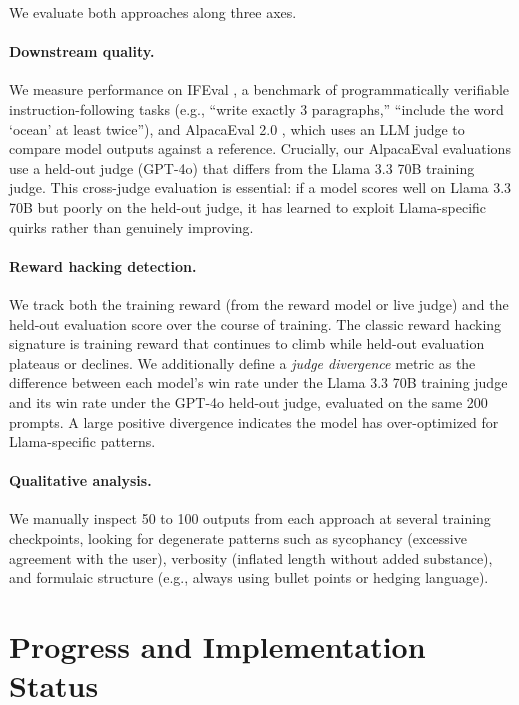 \documentclass{article}
\begin{document}
We evaluate both approaches along three axes.

\paragraph{Downstream quality.} We measure performance on IFEval \citep{zhou2023ifeval}, a benchmark of programmatically verifiable instruction-following tasks (e.g., ``write exactly 3 paragraphs,'' ``include the word `ocean' at least twice''), and AlpacaEval 2.0 \citep{dubois2024alpacaeval}, which uses an LLM judge to compare model outputs against a reference. Crucially, our AlpacaEval evaluations use a held-out judge (GPT-4o) that differs from the Llama 3.3 70B training judge. This cross-judge evaluation is essential: if a model scores well on Llama 3.3 70B but poorly on the held-out judge, it has learned to exploit Llama-specific quirks rather than genuinely improving.

\paragraph{Reward hacking detection.} We track both the training reward (from the reward model or live judge) and the held-out evaluation score over the course of training. The classic reward hacking signature is training reward that continues to climb while held-out evaluation plateaus or declines. We additionally define a \emph{judge divergence} metric as the difference between each model's win rate under the Llama 3.3 70B training judge and its win rate under the GPT-4o held-out judge, evaluated on the same 200 prompts. A large positive divergence indicates the model has over-optimized for Llama-specific patterns.

\paragraph{Qualitative analysis.} We manually inspect 50 to 100 outputs from each approach at several training checkpoints, looking for degenerate patterns such as sycophancy (excessive agreement with the user), verbosity (inflated length without added substance), and formulaic structure (e.g., always using bullet points or hedging language).

\section{Progress and Implementation Status}
\end{document}
